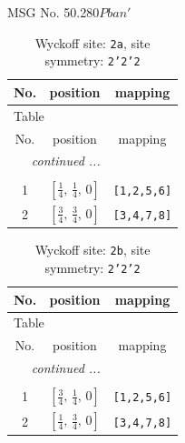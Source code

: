 \documentclass[fleqn,8pt]{jsarticle}
\begin{document}
\setcounter{MaxMatrixCols}{32}

\renewcommand{\tablename}{Table~}
\renewcommand{\figurename}{Figure~}
\begin{center}
\LARGE
MSG No. 50.280\quad$Pban'$
\end{center}
\renewcommand{\arraystretch}{1.2}
\begin{longtable}{ccc}
\caption{Wyckoff site: {\tt 2a}, site symmetry: {\tt 2'2'2}}
 \\
 \hline \hline
No. & position & mapping \\ \hline \endfirsthead

\multicolumn{2}{l}{\tablename\ \thetable{}} \\
 \hline \hline
No. & position & mapping \\ \hline \endhead

 \hline \hline
\multicolumn{2}{r}{\footnotesize\it continued ...} \\ \endfoot

 \hline \hline
\multicolumn{2}{r}{} \\ \endlastfoot

1 & $\left[ \frac{1}{4},\, \frac{1}{4},\, 0 \right]$ & {\tt [1,2,5,6]} \\ \hline
2 & $\left[ \frac{3}{4},\, \frac{3}{4},\, 0 \right]$ & {\tt [3,4,7,8]} \\
\end{longtable}
\renewcommand{\arraystretch}{1.2}
\begin{longtable}{ccc}
\caption{Wyckoff site: {\tt 2b}, site symmetry: {\tt 2'2'2}}
 \\
 \hline \hline
No. & position & mapping \\ \hline \endfirsthead

\multicolumn{2}{l}{\tablename\ \thetable{}} \\
 \hline \hline
No. & position & mapping \\ \hline \endhead

 \hline \hline
\multicolumn{2}{r}{\footnotesize\it continued ...} \\ \endfoot

 \hline \hline
\multicolumn{2}{r}{} \\ \endlastfoot

1 & $\left[ \frac{3}{4},\, \frac{1}{4},\, 0 \right]$ & {\tt [1,2,5,6]} \\ \hline
2 & $\left[ \frac{1}{4},\, \frac{3}{4},\, 0 \right]$ & {\tt [3,4,7,8]} \\
\end{longtable}
\end{document}
